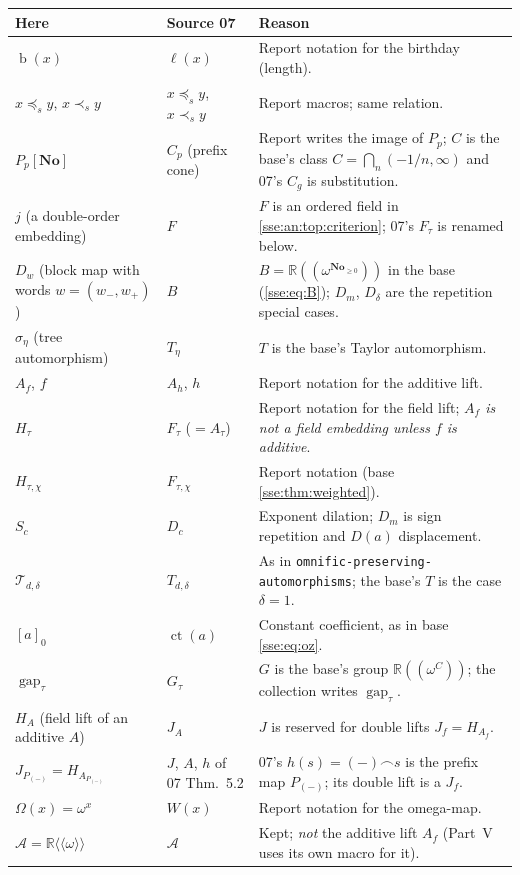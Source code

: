 \documentclass[11pt,a4paper]{article}
\numberwithin{equation}{section}
\theoremstyle{plain}
\theoremstyle{definition}
\theoremstyle{remark}
\newcommand{\No}{\mathbf{No}}
\newcommand{\R}{\mathbb{R}}
\newcommand{\bday}{\operatorname{b}}
\newcommand{\NF}[1]{\R((\omega^{#1}))}
\newcommand{\pref}{\preccurlyeq_s}
\newcommand{\spref}{\prec_s}
\newcommand{\concat}{\mathbin{\frown}}
\newcommand{\fn}[1]{\nolinkurl{#1}}%
\begin{document}
\begingroup\small
\begin{longtable}{P{38mm}P{36mm}P{76mm}}
\toprule
Here & Source 07 & Reason \\
\midrule
\endhead
$\bday(x)$ & $\ell(x)$ & Report notation for the birthday (length). \\
$x\pref y$, $x\spref y$ & $x\preceq_s y$, $x\prec_s y$ & Report macros; same relation. \\
$P_p[\No]$ & $C_p$ (prefix cone) & Report writes the image of $P_p$; $C$ is the base's class $C=\bigcap_n(-1/n,\infty)$ and 07's $C_g$ is substitution. \\
$j$ (a double-order embedding) & $F$ & $F$ is an ordered field in \cref{sse:an:top:criterion}; 07's $F_\tau$ is renamed below. \\
$D_{w}$ (block map with words $w=(w_-,w_+)$) & $B$ & $B=\NF{\No_{\ge0}}$ in the base (\eqref{sse:eq:B}); $D_m$, $D_\delta$ are the repetition special cases. \\
$\sigma_\eta$ (tree automorphism) & $T_\eta$ & $T$ is the base's Taylor automorphism. \\
$A_f$, $f$ & $A_h$, $h$ & Report notation for the additive lift. \\
$H_\tau$ & $F_\tau$ ($=A_\tau$) & Report notation for the field lift; \emph{$A_f$ is not a field embedding unless $f$ is additive}. \\
$H_{\tau,\chi}$ & $F_{\tau,\chi}$ & Report notation (base \cref{sse:thm:weighted}). \\
$S_c$ & $D_c$ & Exponent dilation; $D_m$ is sign repetition and $D(a)$ displacement. \\
$\mathcal T_{d,\delta}$ & $T_{d,\delta}$ & As in \fn{omnific-preserving-automorphisms}; the base's $T$ is the case $\delta=1$. \\
$[a]_0$ & $\operatorname{ct}(a)$ & Constant coefficient, as in base \eqref{sse:eq:oz}. \\
$\operatorname{gap}_\tau$ & $G_\tau$ & $G$ is the base's group $\NF{C}$; the collection writes $\operatorname{gap}_\tau$. \\
$H_A$ (field lift of an additive $A$) & $J_A$ & $J$ is reserved for double lifts $J_f=H_{A_f}$. \\
$J_{P_{(-)}}=H_{A_{P_{(-)}}}$ & $J$, $A$, $h$ of 07 Thm.~5.2 & 07's $h(s)=(-)\concat s$ is the prefix map $P_{(-)}$; its double lift is a $J_f$. \\
$\Omega(x)=\omega^x$ & $W(x)$ & Report notation for the omega-map. \\
$\mathcal A=\R\langle\!\langle\omega\rangle\!\rangle$ & $\mathcal A$ & Kept; \emph{not} the additive lift $A_f$ (Part~V uses its own macro for it). \\

\end{longtable}
\end{document}

